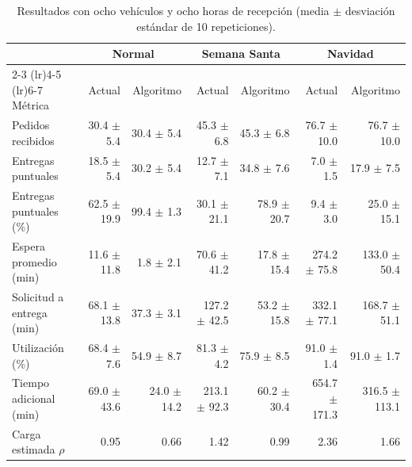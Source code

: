 \documentclass[11pt,letterpaper]{article}
\begin{document}
\begin{table}[htbp]
  \centering
  \footnotesize
  \setlength{\tabcolsep}{4pt}
  \caption{Resultados con ocho vehículos y ocho horas de recepción (media $\pm$ desviación estándar de 10 repeticiones).}
  \label{tab:escenarios}
  \begin{tabular}{l rr rr rr}
    \toprule
    & \multicolumn{2}{c}{Normal} & \multicolumn{2}{c}{Semana Santa} & \multicolumn{2}{c}{Navidad} \\
    \cmidrule(lr){2-3} \cmidrule(lr){4-5} \cmidrule(lr){6-7}
    Métrica & Actual & Algoritmo & Actual & Algoritmo & Actual & Algoritmo \\
    \midrule
    Pedidos recibidos & 30.4 $\pm$ 5.4 & 30.4 $\pm$ 5.4 & 45.3 $\pm$ 6.8 & 45.3 $\pm$ 6.8 & 76.7 $\pm$ 10.0 & 76.7 $\pm$ 10.0 \\
    Entregas puntuales & 18.5 $\pm$ 5.4 & 30.2 $\pm$ 5.4 & 12.7 $\pm$ 7.1 & 34.8 $\pm$ 7.6 & 7.0 $\pm$ 1.5 & 17.9 $\pm$ 7.5 \\
    Entregas puntuales (\%) & 62.5 $\pm$ 19.9 & 99.4 $\pm$ 1.3 & 30.1 $\pm$ 21.1 & 78.9 $\pm$ 20.7 & 9.4 $\pm$ 3.0 & 25.0 $\pm$ 15.1 \\
    Espera promedio (min) & 11.6 $\pm$ 11.8 & 1.8 $\pm$ 2.1 & 70.6 $\pm$ 41.2 & 17.8 $\pm$ 15.4 & 274.2 $\pm$ 75.8 & 133.0 $\pm$ 50.4 \\
    Solicitud a entrega (min) & 68.1 $\pm$ 13.8 & 37.3 $\pm$ 3.1 & 127.2 $\pm$ 42.5 & 53.2 $\pm$ 15.8 & 332.1 $\pm$ 77.1 & 168.7 $\pm$ 51.1 \\
    Utilización (\%) & 68.4 $\pm$ 7.6 & 54.9 $\pm$ 8.7 & 81.3 $\pm$ 4.2 & 75.9 $\pm$ 8.5 & 91.0 $\pm$ 1.4 & 91.0 $\pm$ 1.7 \\
    Tiempo adicional (min) & 69.0 $\pm$ 43.6 & 24.0 $\pm$ 14.2 & 213.1 $\pm$ 92.3 & 60.2 $\pm$ 30.4 & 654.7 $\pm$ 171.3 & 316.5 $\pm$ 113.1 \\
    Carga estimada $\rho$ & 0.95 & 0.66 & 1.42 & 0.99 & 2.36 & 1.66 \\
    \bottomrule
  \end{tabular}
\end{table}
\end{document}
